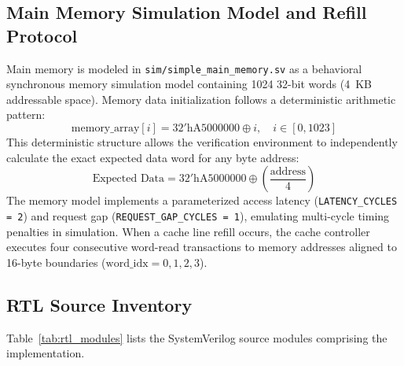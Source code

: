 \documentclass[conference]{IEEEtran}
\begin{document}
\subsection{Main Memory Simulation Model and Refill Protocol}
Main memory is modeled in \texttt{sim/simple\_main\_memory.sv} as a behavioral synchronous memory simulation model containing 1024 32-bit words (4~KB addressable space). Memory data initialization follows a deterministic arithmetic pattern:
\begin{equation}
\text{memory\_array}[i] = 32'\text{hA5000000} \oplus i, \quad i \in [0, 1023]
\end{equation}
This deterministic structure allows the verification environment to independently calculate the exact expected data word for any byte address:
\begin{equation}
\text{Expected Data} = 32'\text{hA5000000} \oplus \left( \frac{\text{address}}{4} \right)
\end{equation}
The memory model implements a parameterized access latency (\texttt{LATENCY\_CYCLES = 2}) and request gap (\texttt{REQUEST\_GAP\_CYCLES = 1}), emulating multi-cycle timing penalties in simulation. When a cache line refill occurs, the cache controller executes four consecutive word-read transactions to memory addresses aligned to 16-byte boundaries ($\text{word\_idx} = 0, 1, 2, 3$).

\subsection{RTL Source Inventory}
Table~\ref{tab:rtl_modules} lists the SystemVerilog source modules comprising the implementation.
\end{document}
